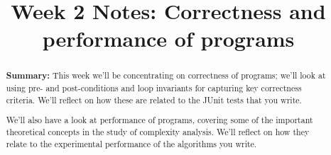 \documentclass[twoside=false,DIV=14]{scrartcl}
\title{\color{redish} \vspace{-2em}Week 2 Notes: Correctness and performance of programs}
\begin{document}
{\color{blackish}\maketitle}\vspace{-2em}

\begin{abstract}
{\bf Summary:}  
This week we'll be concentrating on correctness of programs; we'll look at using pre- and post-conditions and loop invariants for capturing key correctness criteria. We'll reflect on how these are related to the JUnit tests that you write.

We'll also have a look at performance of programs, covering some of the important theoretical concepts in the study of complexity analysis. We'll  reflect on how they relate to the experimental performance of the algorithms you write.
\end{abstract}
\end{document}
